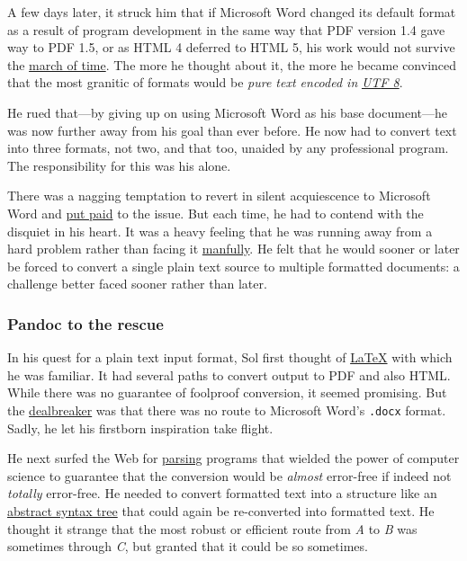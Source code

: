 \documentclass[
  british,
  a4paper,
  rgb,
  dvipsnames,
  svgnames,
  hyphens]{article}
\begin{document}
A few days later, it struck him that if Microsoft Word changed its
default format as a result of program development in the same way that
PDF version 1.4 gave way to PDF 1.5, or as HTML 4 deferred to HTML 5,
his work would not survive the
\href{https://www.youtube.com/watch?v=FTLylKsI8xY\&feature=emb_imp_woyt}{march
of time}. The more he thought about it, the more he became convinced
that the most granitic of formats would be \emph{pure text encoded in}
\href{https://en.wikipedia.org/wiki/UTF-8}{\emph{UTF 8}}.

He rued that---by giving up on using Microsoft Word as his base
document---he was now further away from his goal than ever before. He
now had to convert text into three formats, not two, and that too,
unaided by any professional program. The responsibility for this was his
alone.

There was a nagging temptation to revert in silent acquiescence to
Microsoft Word and
\href{https://www.phrases.org.uk/meanings/put-paid-to.html}{put paid} to
the issue. But each time, he had to contend with the disquiet in his
heart. It was a heavy feeling that he was running away from a hard
problem rather than facing it
\href{https://www.dictionary.com/browse/manful}{manfully}. He felt that
he would sooner or later be forced to convert a single plain text source
to multiple formatted documents: a challenge better faced sooner rather
than later.

\hypertarget{pandoc-to-the-rescue}{%
\subsubsection{Pandoc to the rescue}\label{pandoc-to-the-rescue}}

In his quest for a plain text input format, Sol first thought of
\href{https://en.wikipedia.org/wiki/LaTeX}{LaTeX} with which he was
familiar. It had several paths to convert output to PDF and also HTML.
While there was no guarantee of foolproof conversion, it seemed
promising. But the
\href{https://dictionary.cambridge.org/dictionary/english/dealbreaker}{dealbreaker}
was that there was no route to Microsoft Word's \texttt{.docx} format.
Sadly, he let his firstborn inspiration take flight.

He next surfed the Web for
\href{https://themightyprogrammer.dev/article/parsing}{parsing} programs
that wielded the power of computer science to guarantee that the
conversion would be \emph{almost} error-free if indeed not
\emph{totally} error-free. He needed to convert formatted text into a
structure like an
\href{https://en.wikipedia.org/wiki/Abstract_syntax_tree}{abstract
syntax tree} that could again be re-converted into formatted text. He
thought it strange that the most robust or efficient route from \emph{A}
to \emph{B} was sometimes through \emph{C}, but granted that it could be
so sometimes.
\end{document}
